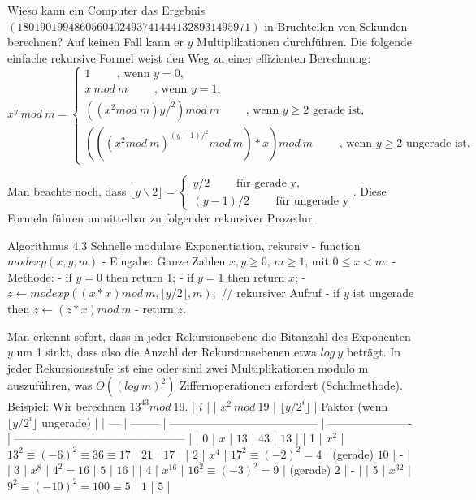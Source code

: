 \documentclass[a4paper]{article}
\begin{document}
\begin{multicols}{3}
    Wieso kann ein Computer das Ergebnis $(18019019948605604024937414441328931495971)$ in Bruchteilen von Sekunden berechnen? Auf keinen Fall kann er $y$ Multiplikationen durchführen. Die folgende einfache rekursive Formel weist den Weg zu einer effizienten Berechnung:
    $$x^y\ mod\ m=\begin{cases} 1\quad\quad\text{ , wenn } y=0,\\ x\ mod\ m\quad\quad\text{ , wenn } y= 1,\\ ((x^2 mod\ m)y/^2 ) mod\ m\quad\quad\text{ , wenn } y\geq 2 \text{ gerade ist},\\ (((x^2 mod\ m)^{(y-1)/^2} mod\ m)*x) mod\ m\quad\quad\text{ , wenn } y\geq 2 \text{ ungerade ist}.\end{cases}$$

    Man beachte noch, dass $\lfloor y\backslash 2\rfloor=\begin{cases} y/2\quad\quad\text{ für gerade y},\\ (y-1)/2\quad\quad\text{ für ungerade y}\end{cases}$. Diese Formeln führen unmittelbar zu folgender rekursiver Prozedur.

    Algorithmus 4.3 Schnelle modulare Exponentiation, rekursiv
    - function $modexp(x,y,m)$
    - Eingabe: Ganze Zahlen $x,y\geq 0$, $m\geq 1$, mit $0\leq x < m$.
    - Methode:
    - if $y= 0$ then return $1$;
    - if $y= 1$ then return $x$;
    - $z\leftarrow modexp((x*x) mod\ m,\lfloor y/2\rfloor,m);$ // rekursiver Aufruf
    - if $y$ ist ungerade then $z\leftarrow (z*x) mod\ m$
    - return $z$.

    Man erkennt sofort, dass in jeder Rekursionsebene die Bitanzahl des Exponenten $y$ um 1 sinkt, dass also die Anzahl der Rekursionsebenen etwa $log\ y$ beträgt. In jeder Rekursionsstufe ist eine oder sind zwei Multiplikationen modulo m auszuführen, was $O((log\ m)^2)$ Ziffernoperationen erfordert (Schulmethode).
    Beispiel: Wir berechnen $13^{43} mod\ 19$.
    | $i$ |          | $x^{2^i} mod\ 19$                       | $\lfloor y/2^i\rfloor$ | Faktor (wenn $\lfloor y/2^i\rfloor$ ungerade) |
    | --- | -------- | --------------------------------------- | ---------------------- | --------------------------------------------- |
    | 0   | $x$      | $13$                                    | $43$                   | $13$                                          |
    | 1   | $x^2$    | $13^2 \equiv (-6)^2 \equiv 36\equiv 17$ | $21$                   | $17$                                          |
    | 2   | $x^4$    | $17^2 \equiv (-2)^2 = 4$                | (gerade) $10$          | -                                             |
    | 3   | $x^8$    | $4^2 = 16$                              | $5$                    | $16$                                          |
    | 4   | $x^{16}$ | $16^2 \equiv (-3)^2 = 9$                | (gerade) $2$           | -                                             |
    | 5   | $x^{32}$ | $9^2 \equiv (-10)^2 = 100\equiv 5$      | $1$                    | $5$                                           |


\end{multicols}
\end{document}
